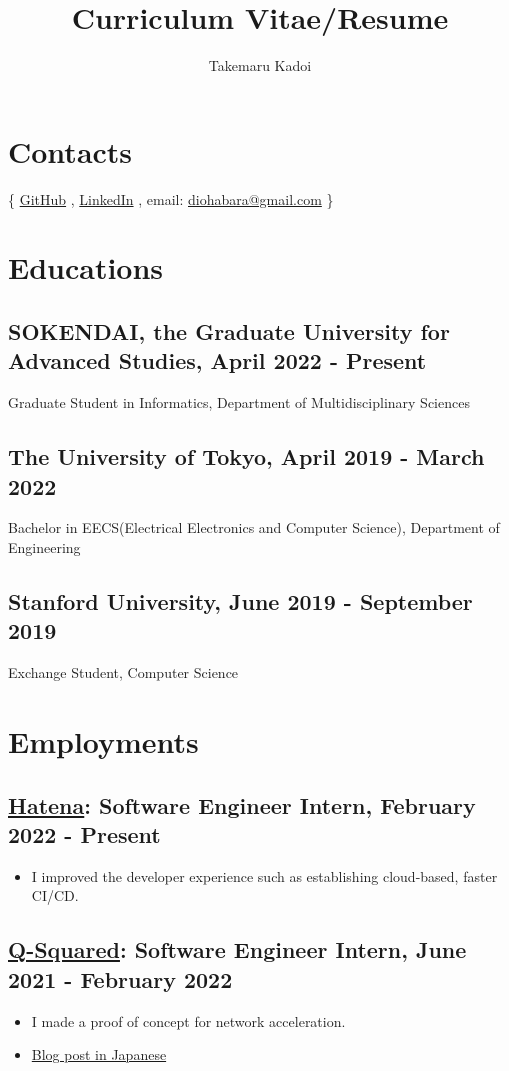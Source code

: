 \documentclass[12pt]{article}
\title{\vspace{-1cm}Curriculum Vitae/Resume}
\author{Takemaru Kadoi}
\date{}
\begin{document}

\section*{Contacts}
  \{
    \href{https://github.com/diohabara/}{GitHub}
    , \href{https://www.linkedin.com/in/takemaru-kadoi}{LinkedIn}
    , email: \href{mailto:diohabara@gmail.com}{diohabara@gmail.com}
  \}

\section*{Educations}
  \subsection*{SOKENDAI, the Graduate University for Advanced Studies, April 2022 - Present}
    Graduate Student in Informatics, Department of Multidisciplinary Sciences
  \subsection*{The University of Tokyo, April 2019 - March 2022}
    Bachelor in EECS(Electrical Electronics and Computer Science), Department of Engineering
  \subsection*{Stanford University, June 2019 - September 2019}
    Exchange Student, Computer Science

\section*{Employments}
  \subsection*{\href{https://hatenacorp.jp/}{Hatena}: Software Engineer Intern, February 2022 - Present}
    \begin{itemize}
      \item I improved the developer experience such as establishing cloud-based, faster CI/CD.
    \end{itemize}
  \subsection*{\href{https://q-squared.jp}{Q-Squared}: Software Engineer Intern, June 2021 - February 2022}
    \begin{itemize}
      \item I made a proof of concept for network acceleration.
      \item \href{https://flossy-era-126.notion.site/DPDK-Potential-in-Finance-840b0d289273495192eb04d97d268eeb}{Blog post in Japanese}
    \end{itemize}
\end{document}
